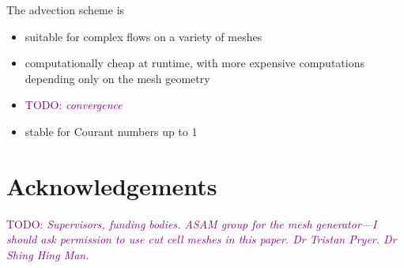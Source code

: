 \documentclass[times]{elsarticle}
\newcommand{\TODO}[1]{\textcolor{purple}{TODO: \emph{#1}}}
\begin{document}
The advection scheme is
\begin{itemize}
	\item suitable for complex flows on a variety of meshes
	\item computationally cheap at runtime, with more expensive computations depending only on the mesh geometry
	\item \TODO{convergence}
	\item stable for Courant numbers up to 1
\end{itemize}

\section{Acknowledgements}
\TODO{Supervisors, funding bodies.  ASAM group for the mesh generator---I should ask permission to use cut cell meshes in this paper.  Dr Tristan Pryer.  Dr Shing Hing Man.}





\end{document}
